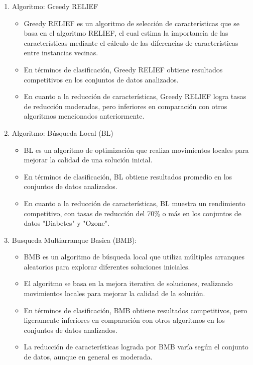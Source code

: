\begin{enumerate}
	\item Algoritmo: Greedy RELIEF
	
	\begin{itemize}
		\item Greedy RELIEF es un algoritmo de selección de características que se basa en el algoritmo RELIEF, el cual estima la importancia de las características mediante el cálculo de las diferencias de características entre instancias vecinas.
		\item En términos de clasificación, Greedy RELIEF obtiene resultados competitivos en los conjuntos de datos analizados.
		\item En cuanto a la reducción de características, Greedy RELIEF logra tasas de reducción moderadas, pero inferiores en comparación con otros algoritmos mencionados anteriormente.
	\end{itemize}
	
	\item Algoritmo: Búsqueda Local (BL)
	
	\begin{itemize}
		\item BL es un algoritmo de optimización que realiza movimientos locales para mejorar la calidad de una solución inicial.
		\item En términos de clasificación, BL obtiene resultados promedio en los conjuntos de datos analizados.
		\item En cuanto a la reducción de características, BL muestra un rendimiento competitivo, con tasas de reducción del 70\% o más en los conjuntos de datos "Diabetes" y "Ozone".
	\end{itemize}
	
	\item Busqueda Multiarranque Basica (BMB):
	
	\begin{itemize}
		\item BMB es un algoritmo de búsqueda local que utiliza múltiples arranques aleatorios para explorar diferentes soluciones iniciales.
		\item  El algoritmo se basa en la mejora iterativa de soluciones, realizando movimientos locales para mejorar la calidad de la solución.
		\item En términos de clasificación, BMB obtiene resultados competitivos, pero ligeramente inferiores en comparación con otros algoritmos en los conjuntos de datos analizados.
		\item La reducción de características lograda por BMB varía según el conjunto de datos, aunque en general es moderada.
	\end{itemize}
	

\end{enumerate}
